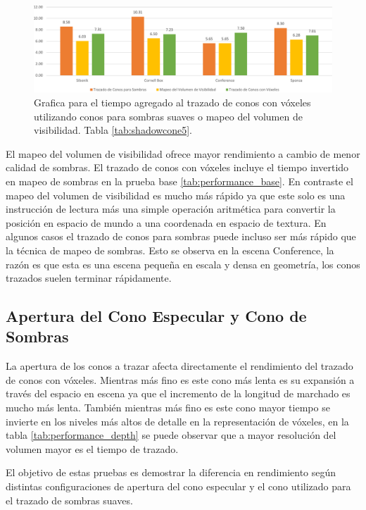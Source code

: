 \begin{figure}[H]
	\centering
	\includegraphics[width=0.95\linewidth]{media/shadowtrace_time_cropped.pdf}
	\caption{Grafica para el tiempo agregado al trazado de conos con vóxeles utilizando conos para sombras suaves o mapeo del volumen de visibilidad. Tabla \ref{tab:shadowcone5}.}
	\label{fig:voxeltrace_shadowing}
\end{figure}

El mapeo del volumen de visibilidad ofrece mayor rendimiento a cambio de menor calidad de sombras. El trazado de conos con vóxeles incluye el tiempo invertido en mapeo de sombras en la prueba base \ref{tab:performance_base}. En contraste el mapeo del volumen de visibilidad es mucho más rápido ya que este solo es una instrucción de lectura más una simple operación aritmética para convertir la posición en espacio de mundo a una coordenada en espacio de textura. En algunos casos el trazado de conos para sombras puede incluso ser más rápido que la técnica de mapeo de sombras. Esto se observa en la escena Conference, la razón es que esta es una escena pequeña en escala y densa en geometría, los conos trazados suelen terminar rápidamente.

\subsection{Apertura del Cono Especular y Cono de Sombras}

La apertura de los conos a trazar afecta directamente el rendimiento del trazado de conos con vóxeles. Mientras más fino es este cono más lenta es su expansión a través del espacio en escena ya que el incremento de la longitud de marchado es mucho más lenta. También mientras más fino es este cono mayor tiempo se invierte en los niveles más altos de detalle en la representación de vóxeles, en la tabla \ref{tab:performance_depth} se puede observar que a mayor resolución del volumen mayor es el tiempo de trazado.

El objetivo de estas pruebas es demostrar la diferencia en rendimiento según distintas configuraciones de apertura del cono especular y el cono utilizado para el trazado de sombras suaves.

